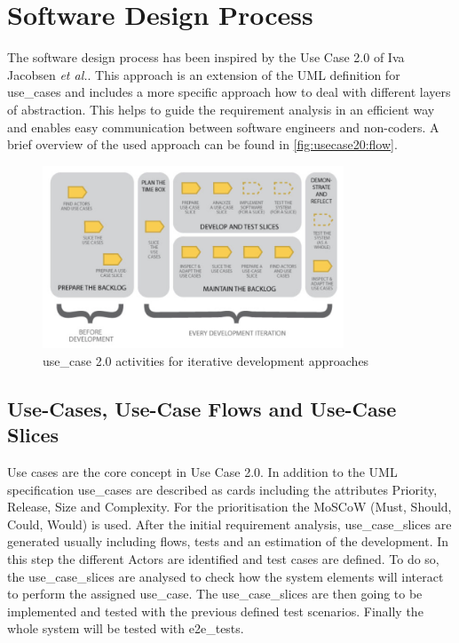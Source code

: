 \section{Software Design Process}
\label{sec:design}

The software design process has been inspired by the Use Case 2.0 \cite{jacobson2011usecase} of Iva Jacobsen \textit{et al.}. This approach is an extension of the \gls{UML} definition for \glspl{use_case} and includes a more specific approach how to deal with different layers of abstraction. This helps to guide the requirement analysis in an efficient way and enables easy communication between software engineers and non-coders. A brief overview of the used approach can be found in \autoref{fig:usecase20:flow}.

\begin{figure}[!ht]
\centering
\includegraphics[width=0.8\textwidth]{figures/uc20_flow}
\caption{\gls{use_case} 2.0 activities for iterative development approaches \cite{jacobson2011usecase}}
\label{fig:usecase20:flow}
\end{figure}


\subsection{Use-Cases, Use-Case Flows and Use-Case Slices}
Use cases are the core concept in Use Case 2.0. In addition to the \gls{UML} specification \glspl{use_case} are described as cards including the attributes Priority, Release, Size and Complexity. For the prioritisation the MoSCoW (Must, Should, Could, Would) is used. After the initial requirement analysis, \glspl{use_case_slice} are generated usually including flows, tests and an estimation of the development. In this step the different \glspl{Actor} are identified and test cases are defined. To do so, the \glspl{use_case_slice} are analysed to check how the system elements will interact to perform the assigned \gls{use_case}. The \glspl{use_case_slice} are then going to be implemented and tested with the previous defined test scenarios. Finally the whole system will be tested with \glspl{e2e_test}.

